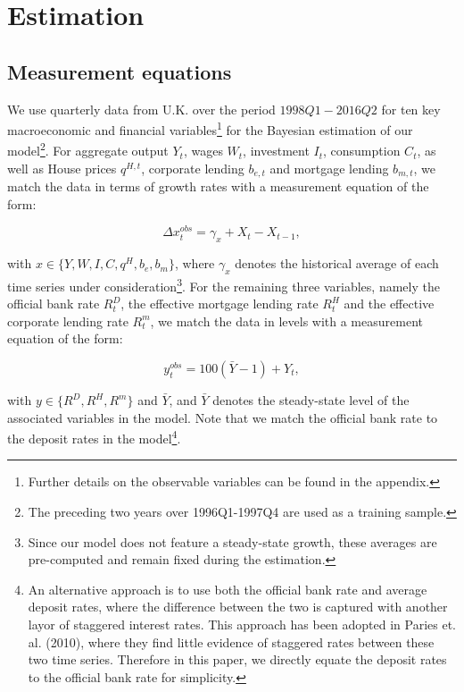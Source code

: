 \documentclass[12pt]{article}
\numberwithin{equation}{section}
\begin{document}
\section{Estimation}



\subsection{Measurement equations} 

We use quarterly data from U.K. over the period $1998Q1-2016Q2$ for ten key macroeconomic and financial variables\footnote{Further details on the observable variables can be found in the appendix.} for the Bayesian estimation of our model\footnote{The preceding two years over 1996Q1-1997Q4 are used as a training sample.}. For aggregate output $Y_t$, wages $W_t$, investment $I_t$, consumption $C_t$, as well as House prices $q^{H,t}$, corporate lending $b_{e,t}$ and mortgage lending $b_{m,t}$, we match the data in terms of growth rates with a measurement equation of the form: 

\begin{equation}
\Delta x_t^{obs}=\gamma_x+ X_t-X_{t-1},
\end{equation}

with $x \in \{Y, W, I, C, q^{H}, b_e, b_m \} $, where $\gamma_x$ denotes the historical average of each time series under consideration\footnote{Since our model does not feature a steady-state growth, these averages are pre-computed and remain fixed during the estimation.}. For the remaining three variables, namely the official bank rate $R^{D}_{t}$, the effective mortgage lending rate $R^H_t$ and the effective corporate lending rate $R^m_t$, we match the data in levels with a measurement equation of the form: 

\begin{equation}
y_t^{obs}=100(\bar{Y}-1) + Y_t,
\end{equation}

with $y \in \{R^D, R^H, R^m \}$ and $\bar{Y}$, and $\bar{Y}$ denotes the steady-state level of the associated variables in the model. Note that we match the official bank rate to the deposit rates in the model\footnote{An alternative approach is to use both the official bank rate and average deposit rates, where the difference between the two is captured with another layor of staggered interest rates. This approach has been adopted in Paries et. al. (2010), where they find little evidence of staggered rates between these two time series. Therefore in this paper, we directly equate the deposit rates to the official bank rate for simplicity.}. 
\end{document}

